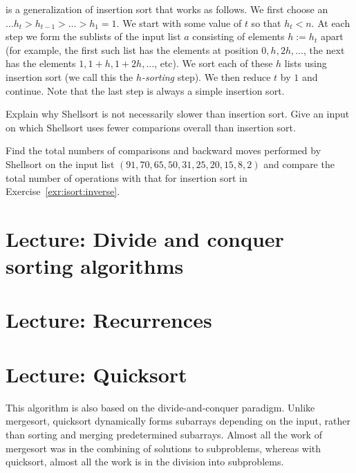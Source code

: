 \begin{Exercise}\label{exr:shellsort}

 is a generalization of insertion sort that works as follows. We first 
choose an  $ \dots h_{t} > h_{t-1} > \ldots > h_{1}=1$. 
We start with some value of $t$ so that $h_t<n$. At each step we form the 
sublists of the input list $a$ consisting of elements $h:=h_t$ apart (for example, 
the first such list has the elements at position $0, h, 2h, \dots $, the next 
has the elements $1, 1+h, 1+2h, \dots $, etc). We sort each of these $h$ lists 
using insertion sort (we call this the \emph{$h$-sorting} step). We then reduce 
$t$ by $1$ and continue. Note that the last step is always a simple insertion 
sort.

Explain why Shellsort is not necessarily slower than insertion sort. Give an input 
on which Shellsort uses fewer comparions overall than insertion sort.
\end{Exercise}


\begin{Exercise}\label{exr:comparedata}
Find the total numbers of comparisons and backward moves performed by Shellsort on the 
input list \((91,70,65,50,31,25,20,15,8,2)\) and compare 
the total number of operations with that for insertion sort in 
Exercise~\ref{exr:isort:inverse}.
\end{Exercise}



\chapter{Lecture: Divide and conquer sorting algorithms}


\chapter{Lecture: Recurrences}

\chapter{Lecture: Quicksort} \label{sec:quicksort}
This algorithm is also based on the divide-and-conquer paradigm. Unlike 
mergesort, quicksort dynamically forms subarrays depending on the input,
rather than sorting and merging predetermined subarrays. Almost all the work of 
mergesort was in the combining of solutions to subproblems, whereas with 
quicksort, almost all the work is in the division into subproblems. 

